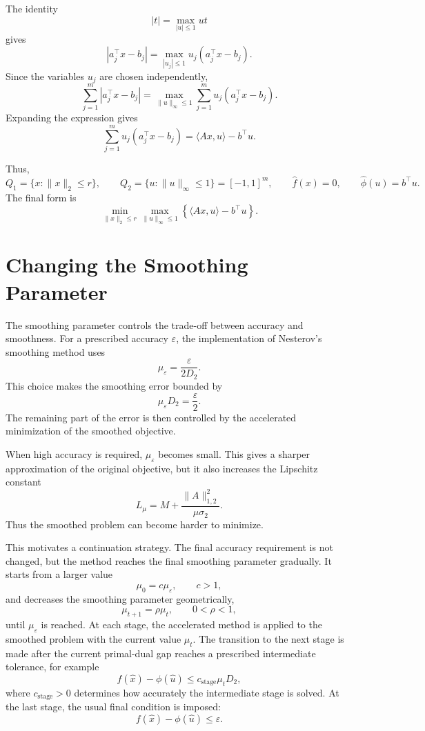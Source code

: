 \documentclass[11pt]{article}
\begin{document}
The identity
\[
    |t|=\max_{|u|\le 1}ut
\]
gives
\[
    |a_j^\top x-b_j|
    =
    \max_{|u_j|\le 1}
    u_j(a_j^\top x-b_j).
\]
Since the variables \(u_j\) are chosen independently,
\[
    \sum_{j=1}^{m}|a_j^\top x-b_j|
    =
    \max_{\|u\|_\infty\le 1}
    \sum_{j=1}^{m}u_j(a_j^\top x-b_j).
\]
Expanding the expression gives
\[
    \sum_{j=1}^{m}u_j(a_j^\top x-b_j)
    =
    \langle Ax,u\rangle-b^\top u.
\]

Thus,
\[
    Q_1=\{x:\|x\|_2\le r\},
    \qquad
    Q_2=\{u:\|u\|_\infty\le 1\}=[-1,1]^m,
    \qquad
    \hat f(x)=0,
    \qquad
    \hat\phi(u)=b^\top u.
\]
The final form is
\[
    \boxed{
    \min_{\|x\|_2\le r}
    \max_{\|u\|_\infty\le 1}
    \left\{
        \langle Ax,u\rangle-b^\top u
    \right\}.
    }
\]




\section{Changing the Smoothing Parameter}
\label{sec:changing-mu}

The smoothing parameter controls the trade-off between accuracy and smoothness.
For a prescribed accuracy \(\varepsilon\), the implementation of Nesterov's
smoothing method uses
\[
    \mu_\varepsilon=\frac{\varepsilon}{2D_2}.
\]
This choice makes the smoothing error bounded by
\[
    \mu_\varepsilon D_2=\frac{\varepsilon}{2}.
\]
The remaining part of the error is then controlled by the accelerated
minimization of the smoothed objective.

When high accuracy is required, \(\mu_\varepsilon\) becomes small. This gives a
sharper approximation of the original objective, but it also increases the
Lipschitz constant
\[
    L_\mu
    =
    M+
    \frac{\|A\|_{1,2}^2}{\mu\sigma_2}.
\]
Thus the smoothed problem can become harder to minimize.

This motivates a continuation strategy. The final accuracy requirement is not
changed, but the method reaches the final smoothing parameter gradually. It
starts from a larger value
\[
    \mu_0=c\mu_\varepsilon,\qquad c>1,
\]
and decreases the smoothing parameter geometrically,
\[
    \mu_{t+1}=\rho\mu_t,\qquad 0<\rho<1,
\]
until \(\mu_\varepsilon\) is reached. At each stage, the accelerated method is
applied to the smoothed problem with the current value \(\mu_t\). The transition
to the next stage is made after the current primal-dual gap reaches a prescribed
intermediate tolerance, for example
\[
    f(\hat x)-\phi(\hat u)
    \le
    c_{\mathrm{stage}}\mu_tD_2,
\]
where \(c_{\mathrm{stage}}>0\) determines how accurately the intermediate stage
is solved. At the last stage, the usual final condition is imposed:
\[
    f(\hat x)-\phi(\hat u)\le \varepsilon.
\]
\end{document}

